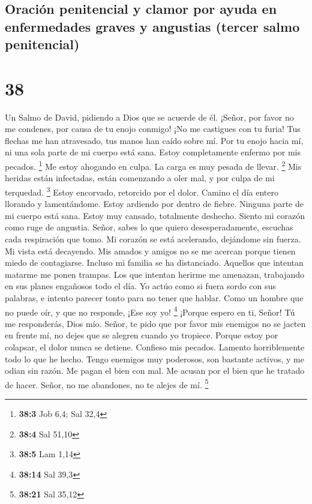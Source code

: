 \hypertarget{oraciuxf3n-penitencial-y-clamor-por-ayuda-en-enfermedades-graves-y-angustias-tercer-salmo-penitencial}{%
\subsection{Oración penitencial y clamor por ayuda en enfermedades
graves y angustias (tercer salmo
penitencial)}\label{oraciuxf3n-penitencial-y-clamor-por-ayuda-en-enfermedades-graves-y-angustias-tercer-salmo-penitencial}}

\hypertarget{section-37}{%
\section{38}\label{section-37}}

Un Salmo de David, pidiendo a Dios que se acuerde de él. 
¡Señor, por favor no me condenes, por causa de tu enojo conmigo! ¡No me
castigues con tu furia!  Tus flechas me han atravesado, tus
manos han caído sobre mí.  Por tu enojo hacia mí, ni una
sola parte de mi cuerpo está sana. Estoy completamente enfermo por mis
pecados. \footnote{\textbf{38:3} Job 6,4; Sal 32,4}  Me
estoy ahogando en culpa. La carga es muy pesada de llevar. \footnote{\textbf{38:4}
  Sal 51,10}  Mis heridas están infectadas, están comenzando
a oler mal, y por culpa de mi terquedad. \footnote{\textbf{38:5} Lam
  1,14}  Estoy encorvado, retorcido por el dolor. Camino el
día entero llorando y lamentándome.  Estoy ardiendo por
dentro de fiebre. Ninguna parte de mi cuerpo está sana. 
Estoy muy cansado, totalmente deshecho. Siento mi corazón como ruge de
angustia.  Señor, sabes lo que quiero desesperadamente,
escuchas cada respiración que tomo.  Mi corazón se está
acelerando, dejándome sin fuerza. Mi vista está decayendo. 
Mis amados y amigos no se me acercan porque tienen miedo de contagiarse.
Incluso mi familia se ha distanciado.  Aquellos que
intentan matarme me ponen trampas. Los que intentan herirme me amenazan,
trabajando en sus planes engañosos todo el día.  Yo actúo
como si fuera sordo con sus palabras, e intento parecer tonto para no
tener que hablar.  Como un hombre que no puede oír, y que
no responde, ¡Ese soy yo! \footnote{\textbf{38:14} Sal 39,3}
 ¡Porque espero en ti, Señor! Tú me responderás, Dios mío.
 Señor, te pido que por favor mis enemigos no se jacten en
frente mí, no dejes que se alegren cuando yo tropiece. 
Porque estoy por colapsar, el dolor nunca se detiene. 
Confieso mis pecados. Lamento horriblemente todo lo que he hecho.
 Tengo enemigos muy poderosos, son bastante activos, y me
odian sin razón.  Me pagan el bien con mal. Me acusan por
el bien que he tratado de hacer.  Señor, no me abandones,
no te alejes de mí. \footnote{\textbf{38:21} Sal 35,12}

